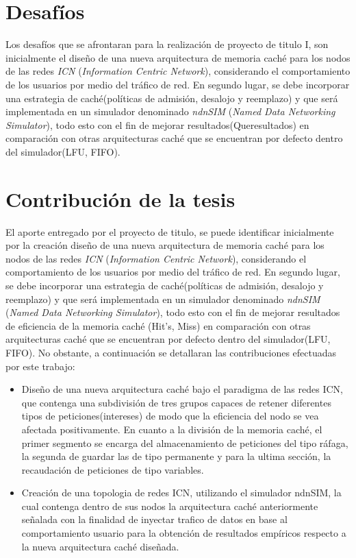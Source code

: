 \documentclass[12pt]{ociamthesis}  %
\begin{document}
\section{Desafíos}
Los desafíos que se afrontaran para la realización de proyecto de titulo I, son inicialmente el diseño de una nueva arquitectura de memoria caché para los nodos de las redes \textit{ICN} (\textit{Information Centric Network}), considerando el comportamiento de los usuarios por medio del tráfico de red. En segundo lugar, se debe incorporar una estrategia de caché(políticas de admisión, desalojo y reemplazo) y que será implementada en un simulador denominado \textit{ndnSIM} (\textit{Named Data Networking Simulator}), todo esto con el fin de mejorar resultados(Queresultados) en comparación con otras arquitecturas caché que se encuentran por defecto dentro del simulador(LFU, FIFO).\\

\section{Contribución de la tesis}
El aporte entregado por el proyecto de titulo, se puede identificar inicialmente por la creación diseño de una nueva arquitectura de memoria caché para los nodos de las redes \textit{ICN} (\textit{Information Centric Network}), considerando el comportamiento de los usuarios por medio del tráfico de red. En segundo lugar, se debe incorporar una estrategia de caché(políticas de admisión, desalojo y reemplazo) y que será implementada en un simulador denominado \textit{ndnSIM} (\textit{Named Data Networking Simulator}), todo esto con el fin de mejorar resultados de eficiencia de la memoria caché (Hit's, Miss) en comparación con otras arquitecturas caché que se encuentran por defecto dentro del simulador(LFU, FIFO). No obstante, a continuación se detallaran las contribuciones efectuadas por este trabajo:\\
\begin{itemize}
	\item Diseño de una nueva arquitectura caché bajo el paradigma de las redes ICN, que contenga una subdivisión de tres grupos capaces de retener diferentes tipos de peticiones(intereses) de modo que la eficiencia del nodo se vea afectada positivamente. En cuanto a la división de la memoria caché, el primer segmento se encarga del almacenamiento de peticiones del tipo ráfaga, la segunda de guardar las de tipo permanente y para la ultima sección, la recaudación de peticiones de tipo variables.\\
	\item Creación de una topologia de redes ICN, utilizando el simulador ndnSIM, la cual contenga dentro de sus nodos la arquitectura caché anteriormente señalada con la finalidad de inyectar trafico de datos en base al comportamiento usuario para la obtención de resultados empíricos respecto a la nueva arquitectura caché diseñada.\\
\end{itemize}
\end{document}
